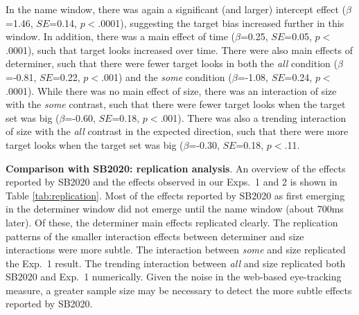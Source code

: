 \documentclass[10pt,letterpaper]{article}
\newcommand{\tableref}[1]{Table \ref{#1}}
\begin{document}
In the name window, there was again a significant (and larger) intercept effect ($\beta$=1.46, $SE$=0.14, $p<$.0001), suggesting the target bias increased further in this window. In addition,  there was a main effect of time  ($\beta$=0.25, $SE$=0.05, $p<$.0001), such that target looks increased over time. There were also main effects of determiner, such that there were fewer target looks in both the \emph{all} condition  ($\beta$=-0.81, $SE$=0.22, $p<$.001) and the \emph{some} condition   ($\beta$=-1.08, $SE$=0.24, $p<$.0001). While there was no main effect of size, there was an interaction of size with the \emph{some} contrast, such that there were fewer target looks when the target set was big   ($\beta$=-0.60, $SE$=0.18, $p<$.001). There was also a trending interaction of size with the \emph{all} contrast in the expected direction, such that there were more target looks when the target set was big ($\beta$=-0.30, $SE$=0.18, $p<$.11.





\textbf{Comparison with SB2020: replication analysis}. An overview of the effects reported by SB2020 and the effects observed in our Exps.~1 and 2 is shown in \tableref{tab:replication}. Most of the effects reported by SB2020 as first emerging in the determiner window did not emerge until the name window (about 700ms later). Of these, the determiner main effects replicated clearly. The replication patterns of the smaller interaction effects between determiner and size interactions were more subtle. The interaction between \emph{some} and size replicated the Exp.~1 result. The trending interaction between \emph{all} and size replicated both SB2020 and Exp.~1 numerically. Given the noise in the web-based eye-tracking measure, a greater sample size may be necessary to detect the more subtle effects reported by SB2020.
\end{document}
